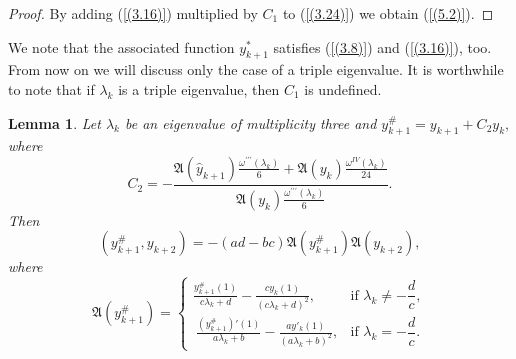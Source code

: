 \documentclass[10pt,a4paper]{amsart}
\newtheorem{lem}[thm]{Lemma}
\numberwithin{equation}{section}
\begin{document}
\begin{proof} By adding (\ref{(3.16)}) multiplied by $C_1$ to (\ref{(3.24)}) we obtain (\ref{(5.2)}).
\end{proof}
We note that the associated function $y_{k+1}^*$ satisfies (\ref{(3.8)}) and (\ref{(3.16)}), too.
From now on we will discuss only the case of a triple eigenvalue. It is worthwhile to note that if $\lambda_k$ is a triple eigenvalue, then $C_1$ is undefined.
\begin{lem}
Let $\lambda_k$ be an eigenvalue of multiplicity three and
\(
y_{k+1}^\# = y_{k+1} + C_2 y_k,
\)
where
\begin{equation}
    C_2=-\frac{\mathfrak{A}(\hat{y}_{k+1})\frac{\omega^{\prime\prime\prime}(\lambda_k)}{6}+\mathfrak{A}(y_k)\frac{\omega^{IV}(\lambda_k)}{24}}{\mathfrak{A}(y_k)\frac{\omega^{\prime\prime\prime}(\lambda_k)}{6}}. \label{(5.3)}
\end{equation}
Then 
\begin{equation}
(y_{k+1}^\#, y_{k+2}) =-(ad-bc)\mathfrak{A}(y_{k+1}^\#)\mathfrak{A}(y_{k+2}), \label{(5.4)}
\end{equation}
where
\begin{equation}
 \mathfrak{A}(y^{\#}_{k+1}) =
\begin{cases}
\displaystyle  
\frac{y^{\#}_{k + 1}(1)}{c\lambda_{k}+d} - \frac{cy_{k}(1)}{{(c\lambda_{k}+d)}^{2}}, 
& \text{if } \lambda_k \neq -\dfrac{d}{c}, \\[10pt]
\displaystyle \ 
\frac{(y^{\#}_{k + 1})'(1)}{a\lambda_{k}+b} - \frac{ay'_{k}(1)}{{(a\lambda_{k}+b)}^{2}}, 
& \text{if } \lambda_k = -\dfrac{d}{c}.
\end{cases} \label{(5.5.1)}  
\end{equation}


\end{lem}
\end{document}
